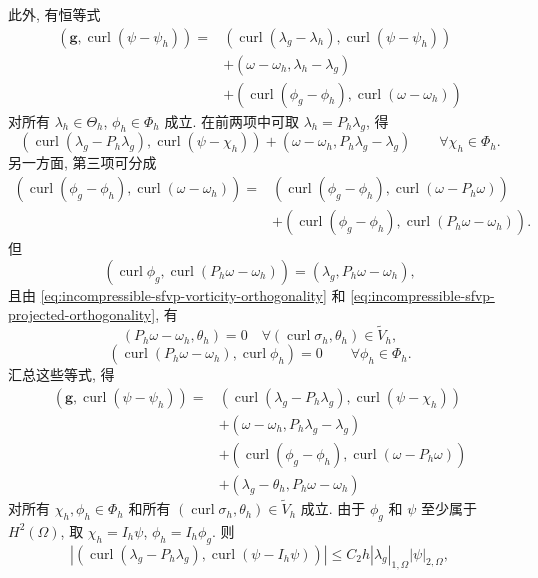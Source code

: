 \begin{Proof}
此外, 有恒等式
\[
\begin{split}
(\mathbf g,\operatorname{curl}(\psi-\psi_h))
={}&(\operatorname{curl}(\lambda_g-\lambda_h),
\operatorname{curl}(\psi-\psi_h))\\
&+(\omega-\omega_h,\lambda_h-\lambda_g)\\
&+(\operatorname{curl}(\phi_g-\phi_h),
\operatorname{curl}(\omega-\omega_h))
\end{split}
\]
对所有 $\lambda_h\in\Theta_h$, $\phi_h\in\Phi_h$ 成立.
在前两项中可取 $\lambda_h=P_h\lambda_g$, 得
\[
(\operatorname{curl}(\lambda_g-P_h\lambda_g),
\operatorname{curl}(\psi-\chi_h))
+(\omega-\omega_h,P_h\lambda_g-\lambda_g)
\qquad\forall\chi_h\in\Phi_h.
\]
另一方面, 第三项可分成
\[
\begin{split}
(\operatorname{curl}(\phi_g-\phi_h),
\operatorname{curl}(\omega-\omega_h))
={}&(\operatorname{curl}(\phi_g-\phi_h),
\operatorname{curl}(\omega-P_h\omega))\\
&+(\operatorname{curl}(\phi_g-\phi_h),
\operatorname{curl}(P_h\omega-\omega_h)).
\end{split}
\]
但
\[
(\operatorname{curl}\phi_g,
\operatorname{curl}(P_h\omega-\omega_h))
=(\lambda_g,P_h\omega-\omega_h),
\]
且由 \eqref{eq:incompressible-sfvp-vorticity-orthogonality}
和 \eqref{eq:incompressible-sfvp-projected-orthogonality}, 有
\[
(P_h\omega-\omega_h,\theta_h)=0
\quad\forall(\operatorname{curl}\sigma_h,\theta_h)
\in\widetilde V_h,
\]
\[
(\operatorname{curl}(P_h\omega-\omega_h),
\operatorname{curl}\phi_h)=0
\qquad\forall\phi_h\in\Phi_h.
\]
汇总这些等式, 得
\begin{equation}\label{eq:incompressible-further-duality-identity}
\begin{split}
(\mathbf g,\operatorname{curl}(\psi-\psi_h))
={}&(\operatorname{curl}(\lambda_g-P_h\lambda_g),
\operatorname{curl}(\psi-\chi_h))\\
&+(\omega-\omega_h,P_h\lambda_g-\lambda_g)\\
&+(\operatorname{curl}(\phi_g-\phi_h),
\operatorname{curl}(\omega-P_h\omega))\\
&+(\lambda_g-\theta_h,P_h\omega-\omega_h)
\end{split}
\end{equation}
对所有 $\chi_h,\phi_h\in\Phi_h$
和所有 $(\operatorname{curl}\sigma_h,\theta_h)\in\widetilde V_h$ 成立.
由于 $\phi_g$ 和 $\psi$ 至少属于 $H^2(\Omega)$, 取
$\chi_h=I_h\psi$, $\phi_h=I_h\phi_g$.
则
\[
|(\operatorname{curl}(\lambda_g-P_h\lambda_g),
\operatorname{curl}(\psi-I_h\psi))|
\leq C_2h|\lambda_g|_{1,\Omega}|\psi|_{2,\Omega},
\]
\end{Proof}
